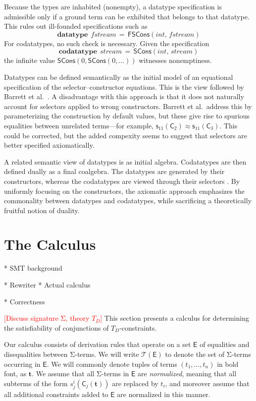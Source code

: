 \documentclass[a4paper,oribibl,envcountsame,draft]{llncs}
\newcommand\Sig{\mathrm{\Sigma}}
\newcommand\keyw[1]{\textbf{#1}}
\newcommand\const[1]{\textsf{#1}}
\newcommand\ty[1]{\textit{#1}}
\renewcommand{\vec}[1]{\boldsymbol{#1}}
\newcommand{\Ec}{\mathsf{E}}
\newcommand{\tEc}{\mathcal{T}(\Ec)}
\newcommand{\teq}{\approx}
\newcommand{\rem}[1]{\textcolor{red}{[#1]}}
\newcommand{\thD}{T_{D}}
\begin{document}
Because the types are inhabited (nonempty), a datatype specification is
admissible only if a ground term can be exhibited that belongs to that datatype.
This rules out ill-founded specifications such as
%
\[\keyw{datatype}\;\, \ty{fstream} \,=\, \const{FSCons}(\ty{int},\,\ty{fstream})\]
%
For codatatypes, no such check is necessary. Given the specification
%
\[\keyw{codatatype}\;\, \ty{stream} \,=\, \const{SCons}(\ty{int},\,\ty{stream})\]
%
the infinite value $\const{SCons}(0, \const{SCons}(0, \ldots))$ witnesses
nonemptiness.

Datatypes can be defined semantically as the initial model of an equational
specification of the selector--constructor equations. This is the view followed
by Barrett et al.\ \cite{barrett-et-al-2010}. A disadvantage with this approach
is that it does not naturally account for selectors applied to wrong
constructors. Barrett et al.\ address this by parameterizing the construction by
default values, but these give rise to spurious equalities between unrelated
terms---for example, $\const{s}_{11}(\const{C}_2) \teq \const{s}_{11}(\const{C}_3)$.
This could be corrected, but the added
compexity seems to suggest that selectors are better specified axiomatically.

A related semantic view of datatypes is as initial algebra. Codatatypes are then
defined dually as a final coalgebra. The datatypes are generated by their
constructors, whereas the codatatypes are viewed through their selectors
\cite{xxx}. By uniformly focusing on the constructors, the axiomatic approach
emphasizes the commonality between datatypes and codatatypes, while sacrificing
a theoretically fruitful notion of duality.

\section{The Calculus}
\label{sec:the-calculus}

  * SMT background

  * Rewriter
  * Actual calculus

  * Correctness

\rem{Discuss signature $\Sig$, theory $\thD$}
This section presents a calculus for determining the satisfiability of conjunctions of $\thD$-constraints.

Our calculus consists of derivation rules that operate on a set $\Ec$ of equalities and disequalities between $\Sig$-terms.
We will write $\tEc$ to denote the set of $\Sig$-terms occurring in $\Ec$.
We will commonly denote tuples of terms $( t_1, \ldots, t_n )$ in bold font, as $\vec t$.
We assume that all $\Sig$-terms in $\Ec$ are \emph{normalized}, meaning that all subterms of the form $s^i_j( \const{C}_j( \vec t ) )$
are replaced by $t_i$, and moreover assume that all additional constraints added to $\Ec$ are normalized in this manner.
\end{document}
